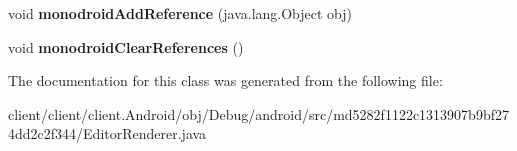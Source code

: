 \begin{DoxyCompactItemize}
\item 
\hypertarget{classmd5282f1122c1313907b9bf274dd2c2f344_1_1EditorRenderer_a4ef83336d31335051e2c5d9e93f13785}{}void {\bfseries monodroid\+Add\+Reference} (java.\+lang.\+Object obj)\label{classmd5282f1122c1313907b9bf274dd2c2f344_1_1EditorRenderer_a4ef83336d31335051e2c5d9e93f13785}

\item 
\hypertarget{classmd5282f1122c1313907b9bf274dd2c2f344_1_1EditorRenderer_aba612a9c3c81f19f0c903fc8e8c4a9d0}{}void {\bfseries monodroid\+Clear\+References} ()\label{classmd5282f1122c1313907b9bf274dd2c2f344_1_1EditorRenderer_aba612a9c3c81f19f0c903fc8e8c4a9d0}

\end{DoxyCompactItemize}


The documentation for this class was generated from the following file\+:\begin{DoxyCompactItemize}
\item 
client/client/client.\+Android/obj/\+Debug/android/src/md5282f1122c1313907b9bf274dd2c2f344/Editor\+Renderer.\+java\end{DoxyCompactItemize}
